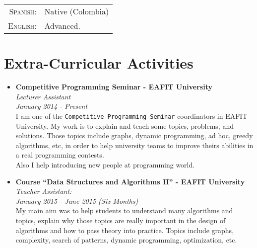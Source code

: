 \documentclass[a4paper,10pt]{article} %
\begin{document}
\begin{tabular}{rl}
\textsc{Spanish:} & Native (Colombia)\\
\textsc{English:} & Advanced.\\
\end{tabular}


\section{Extra-Curricular Activities}
\begin{itemize}
\item \textbf{Competitive Programming Seminar - EAFIT University}\\
\textit{Lecturer Assistant}\\
\textit{January 2014 - Present}\\
I am one of the \texttt{Competitive Programming Seminar} coordinators in EAFIT University. My work is to explain and teach some topics, problems, and solutions. Those topics include graphs, dynamic programming, ad hoc, greedy algorithms, etc, in order to help university teams to improve theirs abilities in a real programming contests.\\
Also I help introducing new people at programming world.
\item \textbf{Course ``Data Structures and Algorithms II'' - EAFIT University}\\
\textit{Teacher Assistant:}\\
\textit{January 2015 - June 2015 (Six Months)}\\
My main aim was to help students to understand many algorithms and topics, explain why those topics are really important in the design of algorithms and how to pass theory into practice. Topics include graphs, complexity, search of patterns, dynamic programming, optimization, etc.\\
\end{itemize}

\end{document}

